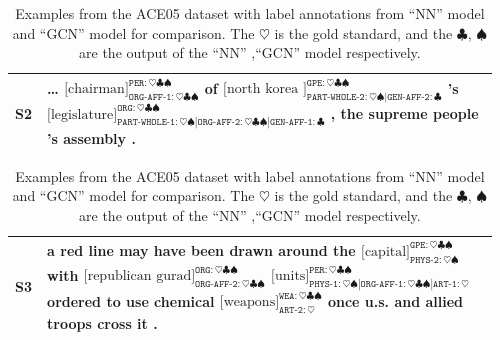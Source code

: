 \begin{table}
    \label{tab:err-2}
    \begin{tabular}{p{0.06\linewidth}|p{0.9\linewidth}}
        \toprule
        S2 &
        \dots
        $\text{[chairman]}_{\texttt{ORG-AFF-1}: \heartsuit \clubsuit \spadesuit}^{\texttt{PER}:\heartsuit \clubsuit \spadesuit}$
        of 
        $\text{[north korea ]}_{\texttt{PART-WHOLE-2}: \heartsuit \spadesuit | \texttt{GEN-AFF-2}: \clubsuit}^{\texttt{GPE}:\heartsuit \clubsuit \spadesuit}$
        's 
        $\text{[legislature]}_{\texttt{PART-WHOLE-1}: \heartsuit \spadesuit| \texttt{ORG-AFF-2}: \heartsuit \clubsuit \spadesuit | \texttt{GEN-AFF-1}: \clubsuit}^{\texttt{ORG}:\heartsuit \clubsuit \spadesuit}$
        , the supreme people  's assembly .    
        \\
        \bottomrule
    \end{tabular}
    \label{tab:err-3}
    \begin{tabular}{p{0.06\linewidth}|p{0.9\linewidth}}
        \toprule
        S3 & 
         a red line may have been drawn around the 
        $\text{[capital]}_{\texttt{PHYS-2}: \heartsuit \spadesuit}^{\texttt{GPE}:\heartsuit \clubsuit \spadesuit}$ 
        with 
        $\text{[republican gurad]}_{\texttt{ORG-AFF-2}: \heartsuit \clubsuit \spadesuit}^{\texttt{ORG}:\heartsuit \clubsuit \spadesuit} $
        $\text{[units]}_{\texttt{PHYS-1}: \heartsuit \spadesuit| \texttt{ORG-AFF-1}: \heartsuit \clubsuit \spadesuit| \texttt{ART-1}: \heartsuit}^{\texttt{PER}:\heartsuit \clubsuit \spadesuit} $
        ordered to use chemical 
        $\text{[weapons]}_{\texttt{ART-2}: \heartsuit}^{\texttt{WEA}:\heartsuit \clubsuit \spadesuit} $
        once u.s. and allied troops cross it .
        \\
        \bottomrule
    \end{tabular}
    \caption{Examples from the ACE05 dataset
    with label annotations from ``NN'' model and ``GCN'' model
    for comparison. 
    The $\heartsuit$ is the gold standard,
    and the $\clubsuit$, $\spadesuit$ are the output of the ``NN'' 
    ,``GCN'' model respectively.}
    \label{tab:case}
\end{table}


